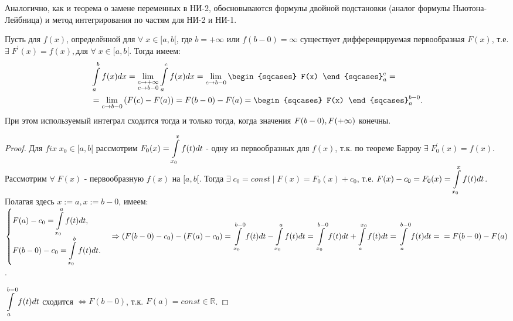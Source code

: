 \begin{col-answer-preambule}
		Аналогично, как и теорема о замене переменных в НИ-2, обосновываются формулы двойной подстановки (аналог формулы Ньютона-Лейбница) и метод интегрирования по частям для НИ-2 и НИ-1.
\end{col-answer-preambule}

\begin{theorem}
Пусть для $f(x)$, определённой для $\forall \; x \in [a, b[$, где $b = + \infty$ или $f(b - 0) = \infty$ существует дифференцируемая первообразная $F(x)$, т.е. $\exists \; F^{'}(x) = f(x), \text{для }\forall \; x \in [a, b[$. Тогда имеем:
\begin{equation*}
\begin{split}
&\dint\limits_{a}^{b} f(x)dx = \lim\limitslimits{c \to + \infty}{c \to b-0} \dint\limits_{a}^{c} f(x)dx = \lim\limits_{c\to b-0} \begin{sqcases} F(x) \end{sqcases}^{c}_{a} = \\
& =\lim\limits_{c\to b-0} \left(F(c) - F(a)\right) = F(b-0) - F(a) = \begin{sqcases} F(x) \end{sqcases}^{b-0}_{a}.
\end{split}
\end{equation*}
При этом используемый интеграл сходится тогда и только тогда, когда значения $\linebreak F(b-0), F(+\infty)$ конечны.
\end{theorem}
\begin{proof}
	Для $fix \; x_0 \in [a,b[$ рассмотрим $F_0(x) = \displaystyle\int\limits_{x_0}^	{x}f(t)dt$ - одну из первообразных для $f(x)$, т.к. по теореме Барроу $\exists \; F_0^{'}(x) = f(x)$. Рассмотрим $\forall \; F(x)$ - первообразную $f(x)$ на $[a,b[$. Тогда $\exists \; c_0 = const \; | \; F(x) = F_0(x) + c_0$, т.е. $F(x) - c_0 = F_0(x) = \displaystyle\int\limits_{x_0}^{x}f(t)dt$. Полагая здесь $x := a, x := b-0$, имеем: \newline $\begin{cases}F(a) - c_0 = \dintl_{x_0}^{a} f(t)dt, \\ F(b-0) - c_0 = \dintl_{x_0}^{b} f(t)dt. \end{cases} \Rightarrow \left(F(b-0) - c_0\right) - \left(F(a) - c_0\right) = \dintl_{x_0}^{b-0} f(t)dt - \dintl_{x_0}^{a} f(t)dt = \dintl_{x_0}^{b-0} f(t)dt + \dintl_{a}^{x_0} f(t)dt = \dintl_{a}^{b-0} f(t)dt = \newline = F(b-0) - F(a)$.
	
	$\displaystyle\int\limits_{a}^{b-0} f(t)dt$ сходится $\Leftrightarrow F(b-0)$, т.к. $F(a) = const \in \mathbb{R}$.
\end{proof}
